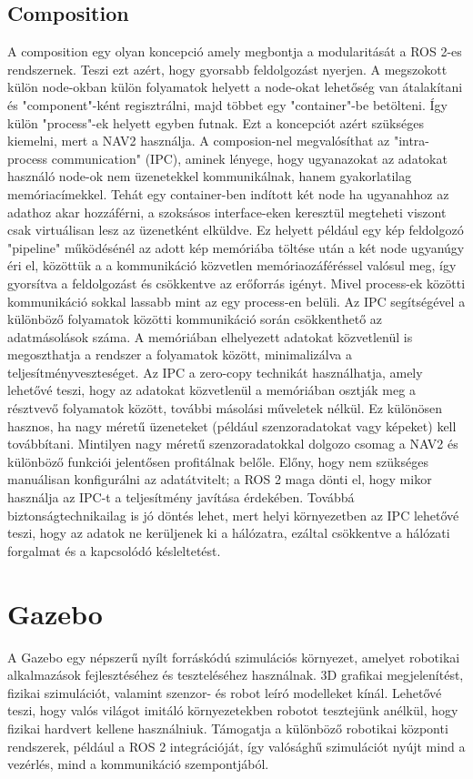 \subsection{Composition}
A composition egy olyan koncepció amely megbontja a modularitását a ROS 2-es rendszernek. Teszi ezt azért, hogy gyorsabb feldolgozást nyerjen. A megszokott külön node-okban külön folyamatok helyett a node-okat lehetőség van átalakítani és "component"-ként regisztrálni, majd többet egy "container"-be betölteni. Így külön "process"-ek helyett egyben futnak. Ezt a koncepciót azért szükséges kiemelni, mert a NAV2 használja. A composion-nel megvalósíthat az "intra-process communication" (IPC), aminek lényege, hogy ugyanazokat az adatokat használó node-ok nem üzenetekkel kommunikálnak, hanem gyakorlatilag memóriacímekkel. Tehát egy container-ben indított két node ha ugyanahhoz az adathoz akar hozzáférni, a szoksásos interface-eken keresztül megteheti viszont csak virtuálisan lesz az üzenetként elküldve. Ez helyett például egy kép feldolgozó "pipeline" működésénél az adott kép memóriába töltése után a két node ugyanúgy éri el, közöttük a a kommunikáció közvetlen memóriaozáféréssel valósul meg, így gyorsítva a feldolgozást és csökkentve az erőforrás igényt. Mivel process-ek közötti kommunikáció sokkal lassabb mint az egy process-en belüli. Az IPC segítségével a különböző folyamatok közötti kommunikáció során csökkenthető az adatmásolások száma. A memóriában elhelyezett adatokat közvetlenül is megoszthatja a rendszer a folyamatok között, minimalizálva a teljesítményveszteséget. Az IPC a zero-copy technikát használhatja, amely lehetővé teszi, hogy az adatokat közvetlenül a memóriában osztják meg a résztvevő folyamatok között, további másolási műveletek nélkül. Ez különösen hasznos, ha nagy méretű üzeneteket (például szenzoradatokat vagy képeket) kell továbbítani. Mintilyen nagy méretű szenzoradatokkal dolgozo csomag a NAV2 és különböző funkciói jelentősen profitálnak belőle. Előny, hogy nem szükséges manuálisan konfigurálni az adatátvitelt; a ROS 2 maga dönti el, hogy mikor használja az IPC-t a teljesítmény javítása érdekében. Továbbá biztonságtechnikailag is jó döntés lehet, mert helyi környezetben az IPC lehetővé teszi, hogy az adatok ne kerüljenek ki a hálózatra, ezáltal csökkentve a hálózati forgalmat és a kapcsolódó késleltetést. \cite{ros2} \cite{ros2_design}

\section{Gazebo}
A Gazebo egy népszerű nyílt forráskódú szimulációs környezet, amelyet robotikai alkalmazások fejlesztéséhez és teszteléséhez használnak. 3D grafikai megjelenítést, fizikai szimulációt, valamint szenzor- és robot leíró modelleket kínál. Lehetővé teszi, hogy valós világot imitáló környezetekben robotot tesztejünk anélkül, hogy fizikai hardvert kellene használniuk. Támogatja a különböző robotikai központi rendszerek, például a ROS 2 integrációját, így valósághű szimulációt nyújt mind a vezérlés, mind a kommunikáció szempontjából.

